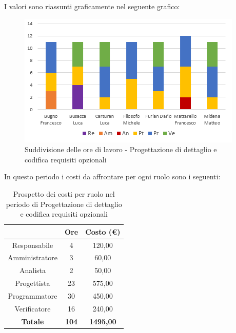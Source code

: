 I valori sono riassunti graficamente nel seguente grafico:

\begin{figure}[H]
  \centering
  \includegraphics[scale=1.2]{immagini/ore_lavoro_reqOpzionali.png}
  \caption{Suddivisione delle ore di lavoro - Progettazione di dettaglio e codifica requisiti opzionali}
\end{figure}

\pagebreak
In questo periodo i costi da affrontare per ogni ruolo sono i seguenti:

\begin{table}[H]
  \centering
  \renewcommand{\arraystretch}{1.8}
  \begin{tabular}{c|c|c}
    \rowcolor[HTML]{125E28}
    \multicolumn{1}{c}{\color[HTML]{FFFFFF}\textbf{Ruolo}}
                    & \multicolumn{1}{c}{\color[HTML]{FFFFFF}\textbf{Ore}}
                    & \multicolumn{1}{c}{\color[HTML]{FFFFFF}\textbf{Costo (€)}}                    \\
    \hline
    Responsabile    & 4                                                          & 120,00           \\
    Amministratore  & 3                                                          & 60,00            \\
    Analista        & 2                                                          & 50,00            \\
    Progettista     & 23                                                         & 575,00           \\
    Programmatore   & 30                                                         & 450,00           \\
    Verificatore    & 16                                                         & 240,00           \\
    \textbf{Totale} & \textbf{104}                                               & \textbf{1495,00}
  \end{tabular}
  \caption{Prospetto dei costi per ruolo nel periodo di Progettazione di dettaglio e codifica requisiti opzionali}
\end{table}

